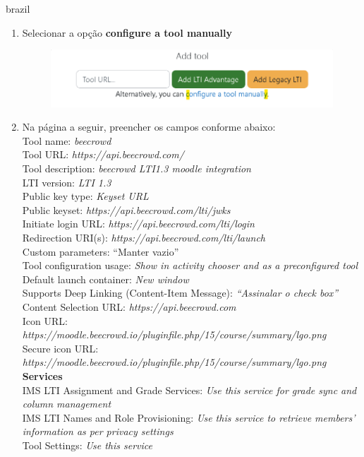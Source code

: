 \begin{otherlanguage*}{brazil}
\begin{enumerate}
    \item Selecionar a opção \textbf{configure a tool manually}

    \begin{figure}[h!]
        \centering
            \includegraphics[scale=0.4]{pictures/apendices/apendice_a_3.png}
    \end{figure}

    \item Na página a seguir, preencher os campos conforme abaixo:\\

    Tool name: \textit{beecrowd} \\
    Tool URL: \textit{https://api.beecrowd.com/} \\
    Tool description: \textit{beecrowd LTI1.3 moodle integration} \\
    LTI version: \textit{LTI 1.3} \\
    Public key type: \textit{Keyset URL} \\
    Public keyset: \textit{https://api.beecrowd.com/lti/jwks} \\
    Initiate login URL: \textit{https://api.beecrowd.com/lti/login} \\
    Redirection URI(s): \textit{https://api.beecrowd.com/lti/launch} \\
    Custom parameters: “Manter vazio” \\
    Tool configuration usage: \textit{Show in activity chooser and as a preconfigured tool} \\
    Default launch container: \textit{New window} \\
    Supports Deep Linking (Content-Item Message): \textit{“Assinalar o check box”} \\
    Content Selection URL: \textit{https://api.beecrowd.com} \\
    
    Icon URL: \textit{https://moodle.beecrowd.io/pluginfile.php/15/course/summary/lgo.png} \\
    Secure icon URL: \textit{https://moodle.beecrowd.io/pluginfile.php/15/course/summary/lgo.png} \\
    
    \textbf{Services} \\
    IMS LTI Assignment and Grade Services:  \textit{Use this service for grade sync and column management} \\
    IMS LTI Names and Role Provisioning: \textit{Use this service to retrieve members' information as per privacy settings} \\
    Tool Settings: \textit{Use this service} \\
    

\end{enumerate}
\end{otherlanguage*}

